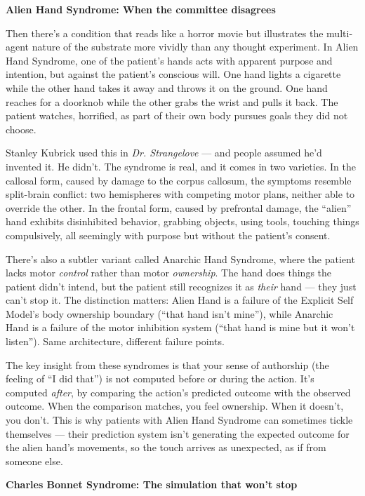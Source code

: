 \documentclass[11pt, twoside, openright]{book}
\begin{document}
\textbf{Alien Hand Syndrome: When the committee disagrees}

Then there's a condition that reads like a horror movie but illustrates the multi-agent nature of the substrate more vividly than any thought experiment. In Alien Hand Syndrome, one of the patient's hands acts with apparent purpose and intention, but against the patient's conscious will. One hand lights a cigarette while the other hand takes it away and throws it on the ground. One hand reaches for a doorknob while the other grabs the wrist and pulls it back. The patient watches, horrified, as part of their own body pursues goals they did not choose.

Stanley Kubrick used this in \textit{Dr. Strangelove} --- and people assumed he'd invented it. He didn't. The syndrome is real, and it comes in two varieties. In the callosal form, caused by damage to the corpus callosum, the symptoms resemble split-brain conflict: two hemispheres with competing motor plans, neither able to override the other. In the frontal form, caused by prefrontal damage, the ``alien'' hand exhibits disinhibited behavior, grabbing objects, using tools, touching things compulsively, all seemingly with purpose but without the patient's consent.

There's also a subtler variant called Anarchic Hand Syndrome, where the patient lacks motor \textit{control} rather than motor \textit{ownership}. The hand does things the patient didn't intend, but the patient still recognizes it as \textit{their} hand --- they just can't stop it. The distinction matters: Alien Hand is a failure of the Explicit Self Model's body ownership boundary (``that hand isn't mine''), while Anarchic Hand is a failure of the motor inhibition system (``that hand is mine but it won't listen''). Same architecture, different failure points.

The key insight from these syndromes is that your sense of authorship (the feeling of ``I did that'') is not computed before or during the action. It's computed \textit{after}, by comparing the action's predicted outcome with the observed outcome. When the comparison matches, you feel ownership. When it doesn't, you don't. This is why patients with Alien Hand Syndrome can sometimes tickle themselves --- their prediction system isn't generating the expected outcome for the alien hand's movements, so the touch arrives as unexpected, as if from someone else.

\textbf{Charles Bonnet Syndrome: The simulation that won't stop}
\end{document}
